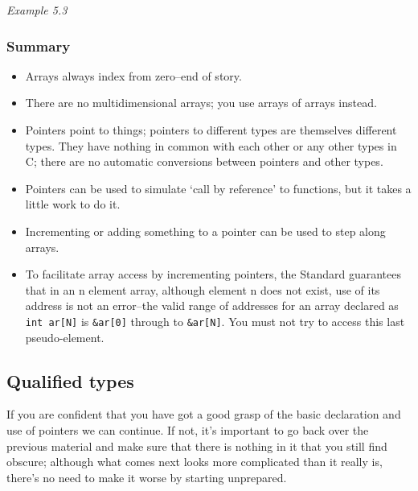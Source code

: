    \begin{center}\textit{Example 5.3}\end{center}


   \subsubsection{Summary}
    \begin{itemize}
     \item Arrays always index from zero--end of story.

     \item There are no multidimensional arrays; you use arrays of arrays
      instead.

     \item Pointers point to things; pointers to different types are
      themselves different types. They have nothing in common with each
      other or any other types in C; there are no automatic conversions
      between pointers and other types.

     \item Pointers can be used to simulate `call by reference' to
      functions, but it takes a little work to do it.

     \item Incrementing or adding something to a pointer can be used to step
      along arrays.

     \item To facilitate array access by incrementing pointers, the Standard
      guarantees that in an n element array, although element
      n does not exist, use of its address is not an
      error--the valid range of addresses for an array declared as
      \texttt{int ar[N]} is \texttt{\&ar[0]} through to
      \texttt{\&ar[N]}. You must not try to access this last
      pseudo-element.
    \end{itemize}
   

  

  \subsection{Qualified types}
   

   If you are confident that you have got a good grasp of the basic
    declaration and use of pointers we can continue. If not, it's important
    to go back over the previous material and make sure that there is
    nothing in it that you still find obscure; although what comes next
    looks more complicated than it really is, there's no need to make it
    worse by starting unprepared.


